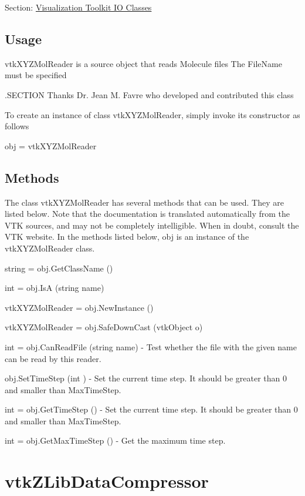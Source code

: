 Section\-: \hyperlink{sec_vtkio}{Visualization Toolkit I\-O Classes} \hypertarget{vtkwidgets_vtkxyplotwidget_Usage}{}\subsection{Usage}\label{vtkwidgets_vtkxyplotwidget_Usage}
vtk\-X\-Y\-Z\-Mol\-Reader is a source object that reads Molecule files The File\-Name must be specified

.S\-E\-C\-T\-I\-O\-N Thanks Dr. Jean M. Favre who developed and contributed this class

To create an instance of class vtk\-X\-Y\-Z\-Mol\-Reader, simply invoke its constructor as follows \begin{DoxyVerb}  obj = vtkXYZMolReader
\end{DoxyVerb}
 \hypertarget{vtkwidgets_vtkxyplotwidget_Methods}{}\subsection{Methods}\label{vtkwidgets_vtkxyplotwidget_Methods}
The class vtk\-X\-Y\-Z\-Mol\-Reader has several methods that can be used. They are listed below. Note that the documentation is translated automatically from the V\-T\-K sources, and may not be completely intelligible. When in doubt, consult the V\-T\-K website. In the methods listed below, {\ttfamily obj} is an instance of the vtk\-X\-Y\-Z\-Mol\-Reader class. 
\begin{DoxyItemize}
\item {\ttfamily string = obj.\-Get\-Class\-Name ()}  
\item {\ttfamily int = obj.\-Is\-A (string name)}  
\item {\ttfamily vtk\-X\-Y\-Z\-Mol\-Reader = obj.\-New\-Instance ()}  
\item {\ttfamily vtk\-X\-Y\-Z\-Mol\-Reader = obj.\-Safe\-Down\-Cast (vtk\-Object o)}  
\item {\ttfamily int = obj.\-Can\-Read\-File (string name)} -\/ Test whether the file with the given name can be read by this reader.  
\item {\ttfamily obj.\-Set\-Time\-Step (int )} -\/ Set the current time step. It should be greater than 0 and smaller than Max\-Time\-Step.  
\item {\ttfamily int = obj.\-Get\-Time\-Step ()} -\/ Set the current time step. It should be greater than 0 and smaller than Max\-Time\-Step.  
\item {\ttfamily int = obj.\-Get\-Max\-Time\-Step ()} -\/ Get the maximum time step.  
\end{DoxyItemize}\hypertarget{vtkio_vtkzlibdatacompressor}{}\section{vtk\-Z\-Lib\-Data\-Compressor}\label{vtkio_vtkzlibdatacompressor}
